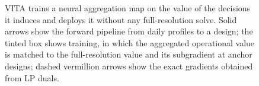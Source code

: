 \begin{figure}[!t]
\caption{VITA trains a neural aggregation map on the value of the decisions it induces and deploys it without any full-resolution solve. Solid arrows show the forward pipeline from daily profiles to a design; the tinted box shows training, in which the aggregated operational value is matched to the full-resolution value and its subgradient at anchor designs; dashed vermillion arrows show the exact gradients obtained from LP duals.}
\label{fig:pipeline}
\end{figure}
